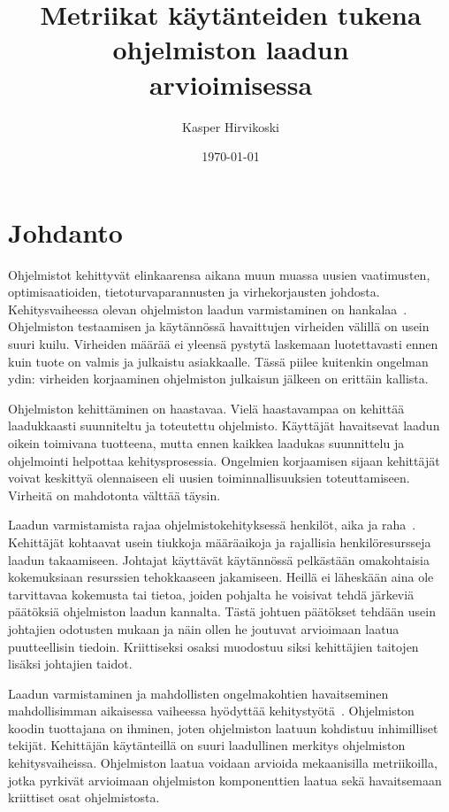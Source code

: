 \documentclass[finnish]{../tktltiki2}
\title{Metriikat käytänteiden tukena ohjelmiston laadun\\arvioimisessa}
\author{Kasper Hirvikoski}
\date{\today}
\theoremstyle{definition}
\theoremstyle{remark}
\begin{document}

\maketitle

\tableofcontents
\newpage


\section{Johdanto}

Ohjelmistot kehittyvät elinkaarensa aikana muun muassa uusien vaatimusten, optimisaatioiden, tietoturvaparannusten ja 
virhekorjausten johdosta. Kehitysvaiheessa olevan ohjelmiston laadun varmistaminen on 
hankalaa~\cite{BBM96, NB05, NB07, ZN08, MNDT09}. Ohjelmiston testaamisen ja käytännössä havaittujen virheiden välillä on 
usein suuri kuilu. Virheiden määrää ei yleensä pystytä laskemaan luotettavasti ennen kuin tuote on valmis ja julkaistu 
asiakkaalle. Tässä piilee kuitenkin ongelman ydin: virheiden korjaaminen ohjelmiston julkaisun jälkeen on erittäin 
kallista.

    Ohjelmiston kehittäminen on haastavaa. Vielä haastavampaa on kehittää laadukkaasti suunniteltu ja toteutettu 
ohjelmisto. Käyttäjät havaitsevat laadun oikein toimivana tuotteena, mutta ennen kaikkea laadukas suunnittelu ja 
ohjelmointi helpottaa kehitysprosessia.  Ongelmien korjaamisen sijaan kehittäjät voivat keskittyä olennaiseen eli uusien 
toiminnallisuuksien toteuttamiseen. Virheitä on mahdotonta välttää täysin.

    Laadun varmistamista rajaa ohjelmistokehityksessä henkilöt, aika ja raha~\cite{BBM96, ZN08}. Kehittäjät kohtaavat 
usein tiukkoja määräaikoja ja rajallisia henkilöresursseja laadun takaamiseen. Johtajat käyttävät käytännössä pelkästään 
omakohtaisia kokemuksiaan resurssien tehokkaaseen jakamiseen. Heillä ei läheskään aina ole tarvittavaa kokemusta tai 
tietoa, joiden pohjalta he voisivat tehdä järkeviä päätöksiä ohjelmiston laadun kannalta. Tästä johtuen päätökset 
tehdään usein johtajien odotusten mukaan ja näin ollen he joutuvat arvioimaan laatua puutteellisin tiedoin. 
Kriittiseksi osaksi muodostuu siksi kehittäjien taitojen lisäksi johtajien taidot.

    Laadun varmistaminen ja mahdollisten ongelmakohtien havaitseminen mahdollisimman aikaisessa vaiheessa hyödyttää 
kehitystyötä~\cite{BBM96, NB05}. Ohjelmiston koodin tuottajana on ihminen, joten ohjelmiston laatuun kohdistuu 
inhimilliset tekijät. Kehittäjän käytänteillä on suuri laadullinen merkitys ohjelmiston kehitysvaiheissa. Ohjelmiston 
laatua voidaan arvioida mekaanisilla metriikoilla, jotka pyrkivät arvioimaan ohjelmiston komponenttien laatua sekä 
havaitsemaan kriittiset osat ohjelmistosta.
\end{document}
